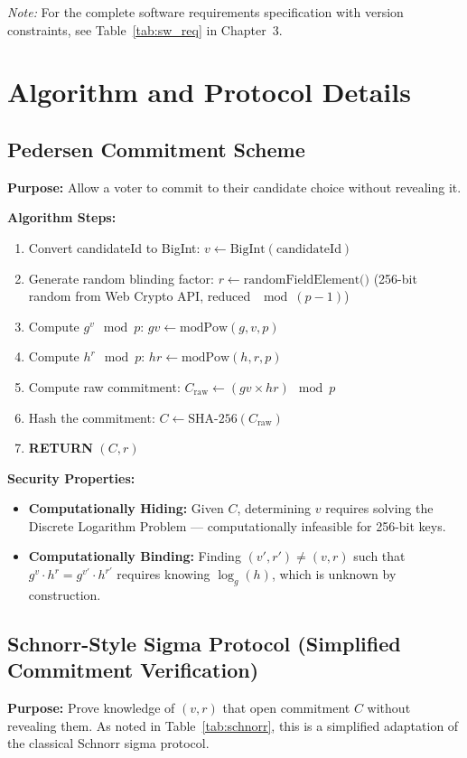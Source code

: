 \documentclass[oneside,a4paper,12pt]{book}
\begin{document}
\textit{Note:} For the complete software requirements specification with version constraints, see Table~\ref{tab:sw_req} in Chapter~3.

\section{Algorithm and Protocol Details}

\subsection{Pedersen Commitment Scheme}
\textbf{Purpose:} Allow a voter to commit to their candidate choice without revealing it.

\textbf{Algorithm Steps:}
\begin{enumerate}[leftmargin=1.5cm]
    \item Convert candidateId to BigInt: $v \leftarrow \text{BigInt}(\text{candidateId})$
    \item Generate random blinding factor: $r \leftarrow \text{randomFieldElement()}$ (256-bit random from Web Crypto API, reduced $\mod (p-1)$)
    \item Compute $g^v \mod p$: $gv \leftarrow \text{modPow}(g, v, p)$
    \item Compute $h^r \mod p$: $hr \leftarrow \text{modPow}(h, r, p)$
    \item Compute raw commitment: $C_{\text{raw}} \leftarrow (gv \times hr) \mod p$
    \item Hash the commitment: $C \leftarrow \text{SHA-256}(C_{\text{raw}})$
    \item \textbf{RETURN} $(C, r)$
\end{enumerate}

\textbf{Security Properties:}
\begin{itemize}[leftmargin=1.5cm]
    \item \textbf{Computationally Hiding:} Given $C$, determining $v$ requires solving the Discrete Logarithm Problem --- computationally infeasible for 256-bit keys.
    \item \textbf{Computationally Binding:} Finding $(v', r') \neq (v, r)$ such that $g^v \cdot h^r = g^{v'} \cdot h^{r'}$ requires knowing $\log_g(h)$, which is unknown by construction.
\end{itemize}

\subsection{Schnorr-Style Sigma Protocol (Simplified Commitment Verification)}
\textbf{Purpose:} Prove knowledge of $(v, r)$ that open commitment $C$ without revealing them. As noted in Table~\ref{tab:schnorr}, this is a simplified adaptation of the classical Schnorr sigma protocol.
\end{document}
